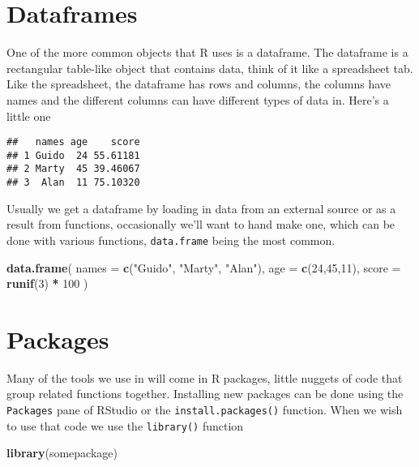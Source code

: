 \documentclass[
]{book}
\newenvironment{Shaded}{\begin{snugshade}}{\end{snugshade}}
\newcommand{\DataTypeTok}[1]{\textcolor[rgb]{0.13,0.29,0.53}{#1}}
\newcommand{\DecValTok}[1]{\textcolor[rgb]{0.00,0.00,0.81}{#1}}
\newcommand{\KeywordTok}[1]{\textcolor[rgb]{0.13,0.29,0.53}{\textbf{#1}}}
\newcommand{\NormalTok}[1]{#1}
\newcommand{\OperatorTok}[1]{\textcolor[rgb]{0.81,0.36,0.00}{\textbf{#1}}}
\newcommand{\StringTok}[1]{\textcolor[rgb]{0.31,0.60,0.02}{#1}}
\begin{document}
\hypertarget{dataframes}{%
\section{Dataframes}\label{dataframes}}

One of the more common objects that R uses is a dataframe. The dataframe is a rectangular table-like object that contains data, think of it like a spreadsheet tab. Like the spreadsheet, the dataframe has rows and columns, the columns have names and the different columns can have different types of data in. Here's a little one

\begin{verbatim}
##   names age    score
## 1 Guido  24 55.61181
## 2 Marty  45 39.46067
## 3  Alan  11 75.10320
\end{verbatim}

Usually we get a dataframe by loading in data from an external source or as a result from functions, occasionally we'll want to hand make one, which can be done with various functions, \texttt{data.frame} being the most common.

\begin{Shaded}
\begin{Highlighting}[]
\KeywordTok{data.frame}\NormalTok{(}
  \DataTypeTok{names =} \KeywordTok{c}\NormalTok{(}\StringTok{"Guido"}\NormalTok{, }\StringTok{"Marty"}\NormalTok{, }\StringTok{"Alan"}\NormalTok{),}
  \DataTypeTok{age =} \KeywordTok{c}\NormalTok{(}\DecValTok{24}\NormalTok{,}\DecValTok{45}\NormalTok{,}\DecValTok{11}\NormalTok{),}
  \DataTypeTok{score =} \KeywordTok{runif}\NormalTok{(}\DecValTok{3}\NormalTok{) }\OperatorTok{*}\StringTok{ }\DecValTok{100}
\NormalTok{)}
\end{Highlighting}
\end{Shaded}

\hypertarget{packages}{%
\section{Packages}\label{packages}}

Many of the tools we use in will come in R packages, little nuggets of code that group related functions together. Installing new packages can be done using the \texttt{Packages} pane of RStudio or the \texttt{install.packages()} function. When we wish to use that code we use the \texttt{library()} function

\begin{Shaded}
\begin{Highlighting}[]
\KeywordTok{library}\NormalTok{(somepackage)}
\end{Highlighting}
\end{Shaded}
\end{document}
